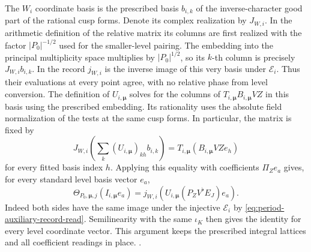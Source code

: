The \(W_i\) coordinate basis is the prescribed basis
\(b_{i,k}\) of the inverse-character good part of the
rational cusp forms. Denote its complex realization by
\(J_{W,i}\). In the arithmetic definition of the relative
matrix its columns are first realized with the factor
\(|P_0|^{-1/2}\) used for the smaller-level pairing. The
embedding into the principal multiplicity space multiplies
by \(|P_0|^{1/2}\), so its \(k\)-th column is precisely
\(J_{W,i}b_{i,k}\). In the record \(j_{W,i}\) is the
inverse image of this very basis under \(\mathcal E_i\).
Thus their evaluations at every point agree, with no
relative phase from level conversion. The definition of
\(U_{i,\boldsymbol\mu}\) solves for the columns of
\(T_{i,\boldsymbol\mu}B_{i,\boldsymbol\mu}VZ\)
in this basis using the prescribed embedding. Its rationality
uses the absolute field normalization of the tests at the same
cusp forms. In particular, the matrix is fixed by
\[
 J_{W,i}\!\left(\sum_k (U_{i,\boldsymbol\mu})_{kh} b_{i,k}\right)
   =T_{i,\boldsymbol\mu}(B_{i,\boldsymbol\mu}VZ e_h)
\]
for every fitted basis index \(h\). Applying this equality
with coefficients \(\Pi_Z e_a\) gives, for every standard
level basis vector \(e_a\),
\begin{equation}
 \label{eq:period-fitted-stage-vector}
 \Theta_{P_0,\boldsymbol\mu,j}(I_{i,\boldsymbol\mu}e_a)
      =j_{W,i}\!\left(U_{i,\boldsymbol\mu}
                          (P_ZV^\flat E_J)e_a\right).
\end{equation}
Indeed both sides have the same image under the injective
\(\mathcal E_i\) by \eqref{eq:period-auxiliary-record-read}.
Semilinearity with the same \(\iota_K\) then gives the
identity for every level coordinate vector. This argument
keeps the prescribed integral lattices and all coefficient
readings in place.
.

